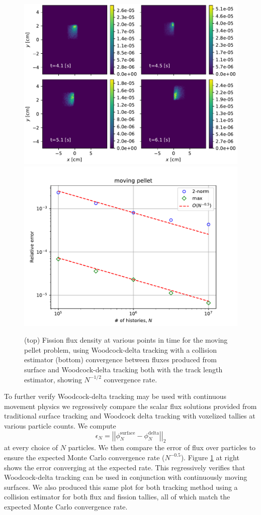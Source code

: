 \begin{figure}
    \centering
    \includegraphics[width=.75\linewidth]{figures/delta_figs/verification/moving_pellet_plot.pdf}
    \vspace{1em}
    \includegraphics[width=.75\linewidth]{figures/delta_figs/verification/moving_pellet.pdf}
    \caption{(top) Fission flux density at various points in time for the moving pellet problem, using Woodcock-delta tracking with a collision estimator (bottom) convergence between fluxes produced from surface and Woodcock-delta tracking both with the track length estimator, showing $N^{-1/2}$ convergence rate.}
    \label{fig:moving_pellet}
\end{figure}

To further verify Woodcock-delta tracking may be used with continuous movement physics we regressively compare the scalar flux solutions provided from traditional surface tracking and Woodcock delta tracking with voxelized tallies at various particle counts.
We compute 
\begin{equation}
    \epsilon_N = \left|\left|\phi_N^{\text{surface}} - \phi_N^{\text{delta}} \right|\right|_2
\end{equation}
at every choice of $N$ particles.
We then compare the error of flux over particles to ensure the expected Monte Carlo convergence rate ($N^{-0.5}$).
Figure \ref{fig:moving_pellet} at right shows the error converging at the expected rate.
This regressively verifies that Woodcock-delta tracking can be used in conjunction with continuously moving surfaces.
We also produced this same plot for both tracking method using a collision estimator for both flux and fission tallies, all of which match the expected Monte Carlo convergence rate.

